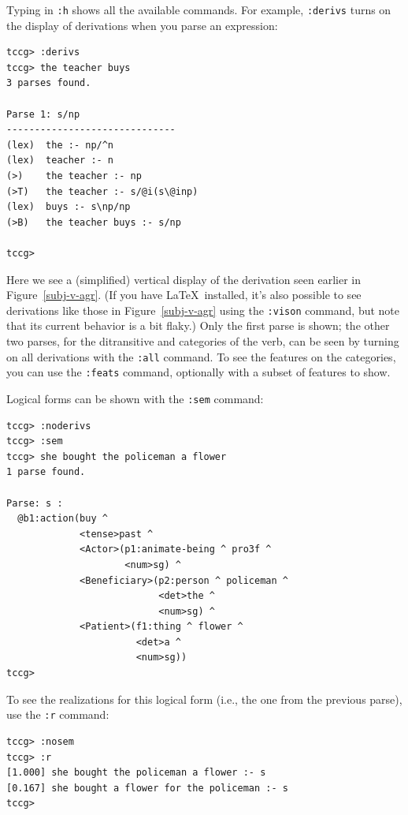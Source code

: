 \documentclass[11pt]{article}
\begin{document}
Typing in \texttt{:h} shows all the available commands.  For example,
\texttt{:derivs} turns on the display of derivations when you parse an
expression:

\begin{small}
\begin{verbatim}
tccg> :derivs
tccg> the teacher buys
3 parses found.

Parse 1: s/np
------------------------------
(lex)  the :- np/^n
(lex)  teacher :- n
(>)    the teacher :- np
(>T)   the teacher :- s/@i(s\@inp)
(lex)  buys :- s\np/np
(>B)   the teacher buys :- s/np

tccg>
\end{verbatim}
\end{small}

\noindent Here we see a (simplified) vertical display of the derivation
seen earlier in Figure~\ref{subj-v-agr}. (If you have \LaTeX\ installed,
it's also possible to see derivations like those in
Figure~\ref{subj-v-agr} using the \texttt{:vison} command, but note that
its current behavior is a bit flaky.) Only the first parse is shown; the
other two parses, for the ditransitive and  
categories of the verb, can be seen by turning on all derivations with
the \texttt{:all} command. To see the features on the categories, you
can use the \texttt{:feats} command, optionally with a subset of
features to show.

Logical forms can be shown with the \texttt{:sem} command:

\begin{small}
\begin{verbatim}
tccg> :noderivs
tccg> :sem
tccg> she bought the policeman a flower
1 parse found.

Parse: s :
  @b1:action(buy ^
             <tense>past ^
             <Actor>(p1:animate-being ^ pro3f ^
                     <num>sg) ^
             <Beneficiary>(p2:person ^ policeman ^
                           <det>the ^
                           <num>sg) ^
             <Patient>(f1:thing ^ flower ^
                       <det>a ^
                       <num>sg))
tccg>
\end{verbatim}
\end{small}

To see the realizations for this logical form (i.e., the one from the 
previous parse), use the \texttt{:r} command:

\begin{small}
\begin{verbatim}
tccg> :nosem
tccg> :r
[1.000] she bought the policeman a flower :- s
[0.167] she bought a flower for the policeman :- s
tccg>
\end{verbatim}
\end{small}
\end{document}
